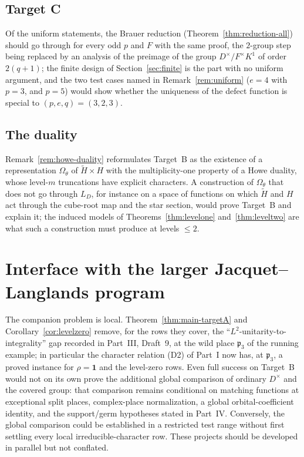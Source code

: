 \documentclass[11pt]{article}
\newcommand{\tH}{\widetilde H}
\newcommand{\pfr}{\mathfrak p}
\theoremstyle{plain}
\theoremstyle{definition}
\begin{document}
\subsection{Target C}
Of the uniform statements, the Brauer reduction (Theorem~\ref{thm:reduction-all})
should go through for every odd $p$ and $F$ with the same proof, the
$2$-group step being replaced by an analysis of the preimage of the
group $D^\times/F^\times K^1$ of order $2(q+1)$; the finite design of
Section~\ref{sec:finite} is the part with no uniform argument, and the
two test cases named in Remark~\ref{rem:uniform} ($e=4$ with $p=3$, and
$p=5$) would show whether the uniqueness of the defect function is
special to $(p,e,q)=(3,2,3)$.

\subsection{The duality}
Remark~\ref{rem:howe-duality} reformulates Target~B as the existence of
a representation $\Omega_\theta$ of $\tH\times H$ with the
multiplicity-one property of a Howe duality, whose level-$m$
truncations have explicit characters.  A construction of
$\Omega_\theta$ that does not go through $L_D$, for instance on a space
of functions on which $\tH$ and $H$ act through the cube-root map and
the star section, would prove Target~B and explain it; the induced
models of Theorems~\ref{thm:levelone} and~\ref{thm:leveltwo} are what
such a construction must produce at levels $\le2$.

\section{Interface with the larger Jacquet--Langlands program}
The companion problem is local.  Theorem~\ref{thm:main-targetA} and
Corollary~\ref{cor:levelzero} remove, for the rows they cover, the
``$L^2$-unitarity-to-integrality'' gap recorded in Part~III, Draft~9,
at the wild place $\pfr_3$ of the running example; in particular the
character relation (D2) of Part~I now has, at $\pfr_3$, a proved
instance for $\rho=\mathbf1$ and the level-zero rows.  Even full
success on Target~B would not on its own prove the additional global
comparison of ordinary $D^\times$ and the covered group: that comparison
remains conditional on matching functions at exceptional split places,
complex-place normalization, a global orbital-coefficient identity,
and the support/germ hypotheses stated in Part~IV.  Conversely, the
global comparison could be established in a restricted test range
without first settling every local irreducible-character row.  These
projects should be developed in parallel but not conflated.
\end{document}
